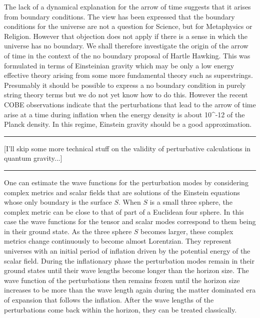 The lack of a dynamical explanation for the arrow of time suggests that it
arises from boundary conditions. The view has been expressed that the
boundary conditions for the universe are not a question for Science, but
for Metaphysics or Religion. However that objection does not apply if
there is a sense in which the universe has no boundary. We shall therefore
investigate the origin of the arrow of time in the context of the no
boundary proposal of Hartle \text{\&}  Hawking. This was formulated in
terms of Einsteinian gravity which may be only a low energy effective theory
arising from some more fundamental theory such as superstrings. Presumably
it should be possible to express a no boundary condition in purely string
theory terms but we do not yet know how to do this. However the recent
COBE observations indicate that the perturbations that lead to
the arrow of time arise at a time during inflation when the energy 
density is about 10^{-12} of the Planck density. In this regime, 
Einstein gravity should be a good approximation.
\par\noindent\rule{\textwidth}{0.4pt}

[I'll skip some more technical stuff on the validity of perturbative
calculations in quantum gravity...]

\par\noindent\rule{\textwidth}{0.4pt}
One can estimate the wave functions for the perturbation modes by
considering complex metrics and scalar fields that are solutions of the
Einstein equations whose only boundary is the surface $S$. When $S$ is a
small three sphere, the complex metric can be close to that of part of a
Euclidean four sphere. In this case the wave functions for the tensor and
scalar modes correspond to them being in their ground state. As the three
sphere $S$ becomes larger, these  complex metrics change continuously to
become almost Lorentzian. They represent universes with an initial period
of inflation driven by the potential energy of the scalar field. During
the inflationary phase the perturbation modes remain in their ground
states until their wave lengths become longer than the horizon size. The
wave function of the perturbations then remains frozen until the horizon
size increases to be more than the wave length again during the matter
dominated era of expansion that follows the inflation. After the wave
lengths of the perturbations come back within the horizon, they can be
treated classically.

